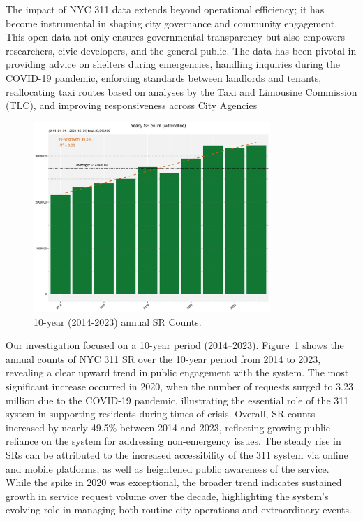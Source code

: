 \documentclass[linenumber]{jdsart}
\begin{document}

The impact of NYC 311 data extends beyond operational efficiency; it
has become instrumental in shaping city governance and community
engagement. This open data not only ensures governmental transparency
but also empowers researchers, civic developers, and the general
public. The data has been pivotal in providing advice on shelters
during emergencies, handling inquiries during the COVID-19 pandemic,
enforcing standards between landlords and tenants, reallocating taxi
routes based on analyses by the Taxi and Limousine Commission (TLC),
and improving responsiveness across City Agencies


\begin{figure}[tbp]
	\centering
  	\includegraphics[width=0.8\textwidth]{10-year-trend_yearly.pdf}
 	\caption{10-year (2014-2023) annual SR Counts.}
  	\label{fig:10-yr}
\end{figure}


Our investigation focused on a 10-year period (2014--2023).
Figure~\ref{fig:10-yr} shows the annual counts of NYC 311 SR over the
10-year period from 2014 to 2023, revealing a clear upward trend in
public engagement with the system. The most significant increase
occurred in 2020, when the number of requests surged to 3.23 million
due to the COVID-19 pandemic, illustrating the essential role of the
311 system in supporting residents during times of crisis. Overall, SR
counts increased by nearly 49.5\% between 2014 and 2023, reflecting
growing public reliance on the system for addressing non-emergency
issues. The steady rise in SRs can be attributed to the increased
accessibility of the 311 system via online and mobile platforms, as
well as heightened public awareness of the service. While the spike in
2020 was exceptional, the broader trend indicates sustained growth in
service request volume over the decade, highlighting the system's
evolving role in managing both routine city operations and
extraordinary events.
\end{document}
